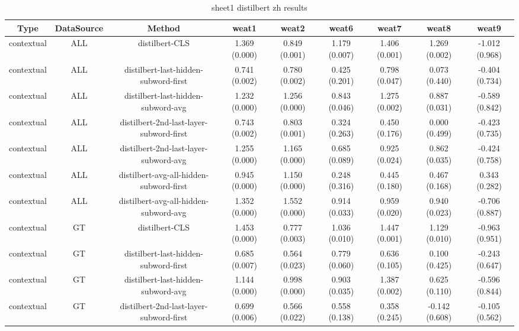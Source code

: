 \begin{sidewaystable}[htb]
    \centering
    \caption{sheet1 distilbert zh results}
    \label{appendix_tab:sheet1_distilbert_zh_results}
    \small
    \begin{tabular}{@{}ccccccccc@{}}
        \toprule
        Type & DataSource & Method & weat1 & weat2 & weat6 & weat7 & weat8 & weat9 \\
        \midrule
        contextual & ALL & distilbert-CLS & 1.369 (0.000) & 0.849 (0.001) & 1.179 (0.007) & 1.406 (0.001) & 1.269 (0.002) & -1.012 (0.968) \\
        contextual & ALL & distilbert-last-hidden-subword-first & 0.741 (0.002) & 0.780 (0.002) & 0.425 (0.201) & 0.798 (0.047) & 0.073 (0.440) & -0.404 (0.734) \\
        contextual & ALL & distilbert-last-hidden-subword-avg & 1.232 (0.000) & 1.256 (0.000) & 0.843 (0.046) & 1.275 (0.002) & 0.887 (0.031) & -0.589 (0.842) \\
        contextual & ALL & distilbert-2nd-last-layer-subword-first & 0.743 (0.002) & 0.803 (0.001) & 0.324 (0.263) & 0.450 (0.176) & 0.000 (0.499) & -0.423 (0.735) \\
        contextual & ALL & distilbert-2nd-last-layer-subword-avg & 1.255 (0.000) & 1.165 (0.000) & 0.685 (0.089) & 0.925 (0.024) & 0.862 (0.035) & -0.424 (0.758) \\
        contextual & ALL & distilbert-avg-all-hidden-subword-first & 0.945 (0.000) & 1.150 (0.000) & 0.248 (0.316) & 0.445 (0.180) & 0.467 (0.168) & 0.343 (0.282) \\
        contextual & ALL & distilbert-avg-all-hidden-subword-avg & 1.352 (0.000) & 1.552 (0.000) & 0.914 (0.033) & 0.959 (0.020) & 0.940 (0.023) & -0.706 (0.887) \\
        contextual & GT & distilbert-CLS & 1.453 (0.000) & 0.777 (0.003) & 1.036 (0.010) & 1.447 (0.001) & 1.129 (0.010) & -0.963 (0.951) \\
        contextual & GT & distilbert-last-hidden-subword-first & 0.685 (0.007) & 0.564 (0.023) & 0.779 (0.060) & 0.636 (0.105) & 0.100 (0.425) & -0.243 (0.647) \\
        contextual & GT & distilbert-last-hidden-subword-avg & 1.144 (0.000) & 0.998 (0.000) & 0.903 (0.035) & 1.387 (0.002) & 0.625 (0.110) & -0.596 (0.844) \\
        contextual & GT & distilbert-2nd-last-layer-subword-first & 0.699 (0.006) & 0.566 (0.022) & 0.558 (0.138) & 0.358 (0.245) & -0.142 (0.608) & -0.105 (0.562) \\

\end{tabular}
\end{sidewaystable}
